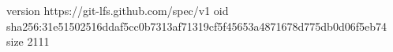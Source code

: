 version https://git-lfs.github.com/spec/v1
oid sha256:31e51502516ddaf5cc0b7313af71319cf5f45653a4871678d775db0d06f5eb74
size 2111
